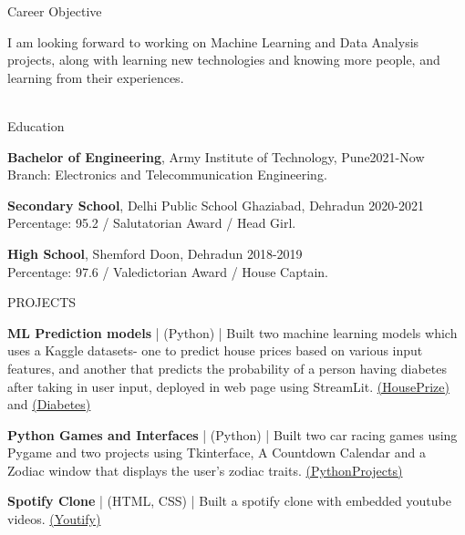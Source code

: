 \documentclass{resume} %
\begin{document}
\begin{rSection}{Career Objective}

{
I am looking forward to working on Machine Learning and Data Analysis projects, along with learning new technologies and knowing more people, and learning from their experiences. \\
\\}
\end{rSection} 



\begin{rSection}{Education}

{\bf Bachelor of Engineering}, Army Institute of Technology, Pune\hfill {2021-Now}\\
Branch: Electronics and Telecommunication Engineering.

{\bf Secondary School}, Delhi Public School Ghaziabad, Dehradun  \hfill {2020-2021}\\
Percentage: 95.2 / Salutatorian Award / Head Girl.

{\bf High School}, Shemford Doon, Dehradun  \hfill {2018-2019}\\
Percentage: 97.6 / Valedictorian Award / House Captain.

\end{rSection}




\begin{rSection}{PROJECTS}

\vspace{-1.25em}
\item \textbf{ML Prediction models} {| (Python) |  Built two machine learning models which uses a Kaggle datasets- one  to predict house prices based on various input features, and another that predicts the probability of a person having diabetes after taking in user input, deployed in web page using StreamLit. \href{https://github.com/shristyyx/House-Prize-preditiction}{(HousePrize)} and \href{(https://github.com/shristyyx/DiabetesTestAImodel)}{(Diabetes)}} 


\item \textbf{Python Games and Interfaces} {| (Python) | Built two car racing games using Pygame and two projects using Tkinterface, A Countdown Calendar and a Zodiac window that displays the user's zodiac traits. \href{https://github.com/shristyyx?tab=repositories}{(PythonProjects)}}



\item \textbf{Spotify Clone} {| (HTML, CSS) | Built a spotify clone with embedded youtube videos. \href{https://github.com/shristyyx/Spotify-Clone}{(Youtify)} }


\end{rSection} 
\end{document}
